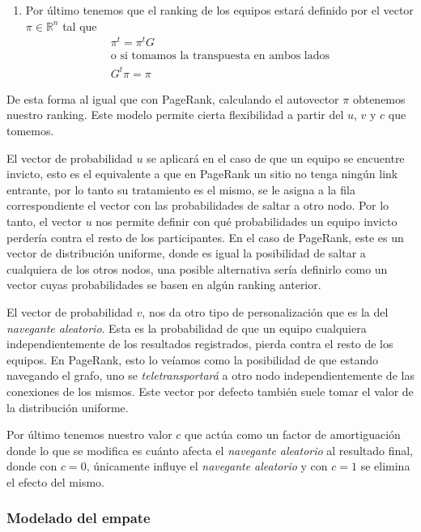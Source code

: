 \begin{enumerate}
	\item Por último tenemos que el ranking de los equipos estará definido por
		el vector $\pi \in \mathbb{R}^n$ tal que
		\begin{gather*}
			\pi^{t} = \pi^{t}G \\
			\text{o si tomamos la transpuesta en ambos lados} \\
			G^{t}\pi = \pi
		\end{gather*}
\end{enumerate}

De esta forma al igual que con PageRank, calculando el autovector $\pi$
obtenemos nuestro ranking. Este modelo permite cierta flexibilidad a partir del
$u$, $v$ y $c$ que tomemos.

El vector de probabilidad $u$ se aplicará en el caso de que un equipo se encuentre invicto, esto
es el equivalente a que en PageRank un sitio no tenga ningún link entrante, por
lo tanto su tratamiento es el mismo, se le asigna a la fila correspondiente el
vector con las probabilidades de saltar a otro nodo. Por lo tanto, el vector $u$
nos permite definir con qué probabilidades un equipo invicto perdería contra el
resto de los participantes. En el caso de PageRank, este es un vector de
distribución uniforme, donde es igual la posibilidad de saltar a cualquiera de
los otros nodos, una posible alternativa sería definirlo como un vector cuyas
probabilidades se basen en algún ranking anterior.

El vector de probabilidad $v$, nos da otro tipo de personalización que es
la del \textit{navegante aleatorio}. Esta es la probabilidad de que un equipo
cualquiera independientemente de los resultados registrados, pierda contra el
resto de los equipos. En PageRank, esto lo veíamos como la posibilidad de que
estando navegando el grafo, uno se \textit{teletransportará} a otro nodo
independientemente de las conexiones de los mismos. Este vector por defecto
también suele tomar el valor de la distribución uniforme.

Por último tenemos nuestro valor $c$ que actúa como un factor de amortiguación
donde lo que se modifica es cuánto afecta el \textit{navegante aleatorio} al
resultado final, donde con $c = 0$, únicamente influye el \textit{navegante
aleatorio} y con $c = 1$ se elimina el efecto del mismo.

\subsubsection*{Modelado del empate}

